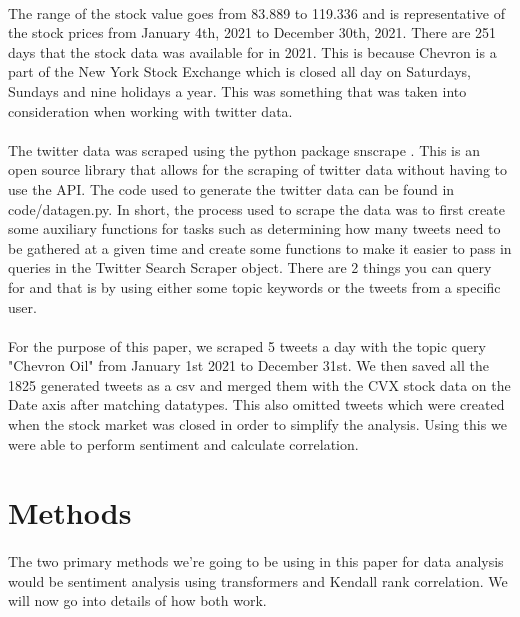 \documentclass[12pt, letterpaper, titlepage]{article}
\begin{document}
	
\paragraph{}
	The range of the stock value goes from 83.889 to 119.336 and is representative of the stock prices from January 4th, 2021 to December 30th, 2021. There are 251 days that the stock data was available for in 2021. This is because Chevron is a part of the New York Stock Exchange which is closed all day on Saturdays, Sundays and nine holidays a year. This was something that was taken into consideration when working with twitter data. 

\paragraph{}
	The twitter data was scraped using the python package snscrape \cite{justanotherarchivist_2022}. This is an open source library that allows for the scraping of twitter data without having to use the API. The code used to generate the twitter data can be found in code/datagen.py. In short, the process used to scrape the data was to first create some auxiliary functions for tasks such as determining how many tweets need to be gathered at a given time and create some functions to make it easier to pass in queries in the Twitter Search Scraper object. There are 2 things you can query for and that is by using either some topic keywords or the tweets from a specific user. 
	
\paragraph{}
	For the purpose of this paper, we scraped 5 tweets a day with the topic query "Chevron Oil" from January 1st 2021 to December 31st.  We then saved all the 1825 generated tweets as a csv and merged them with the CVX stock data on the Date axis after matching datatypes. This also omitted tweets which were created when the stock market was closed in order to simplify the analysis. Using this we were able to perform sentiment and calculate correlation.


\label{sec: methods}
\section{Methods}

\paragraph{}
	The two primary methods we're going to be using in this paper for data analysis would be sentiment analysis using transformers and Kendall rank correlation. We will now go into details of how both work.
\end{document}
